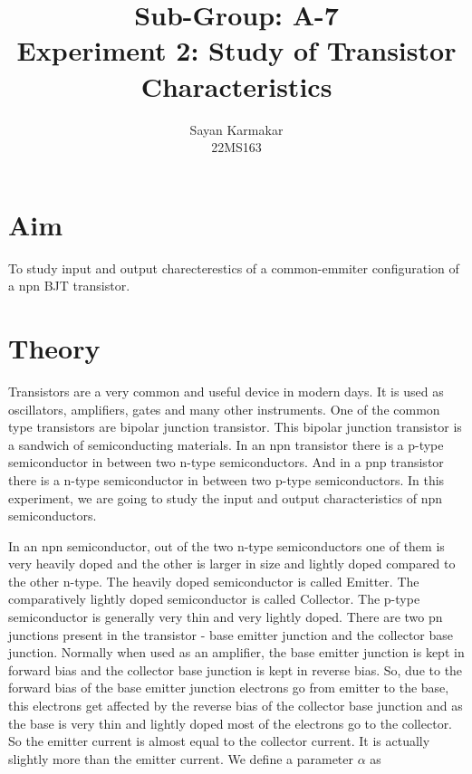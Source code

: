 \documentclass[12pt]{article}
\begin{document}
\title{Sub-Group: A-7 \\ Experiment 2: Study of Transistor Characteristics}


\author{Sayan Karmakar \\22MS163 }
\date{}
\maketitle

\section{Aim}
To study input and output charecterestics of a common-emmiter configuration of a npn BJT transistor.

\section{Theory}
Transistors are a very common and useful device in modern days. It is used as oscillators, amplifiers, gates and many other instruments. One of the common type transistors are bipolar junction transistor. This bipolar junction transistor is a sandwich of semiconducting materials. In an npn transistor there is a p-type semiconductor in between two n-type semiconductors. And in a pnp transistor there is a n-type semiconductor in between two p-type semiconductors. In this experiment, we are going to study the input and output characteristics of npn semiconductors.

In an npn semiconductor, out of the two n-type semiconductors one of them is very heavily doped and the other is larger in size and lightly doped compared to the other n-type. The heavily doped semiconductor is called Emitter. The comparatively lightly doped semiconductor is called Collector. The p-type semiconductor is generally very thin and very lightly doped. There are two pn junctions present in the transistor - base emitter junction and the collector base junction. Normally when used as an amplifier, the base emitter junction is kept in forward bias and the collector base junction is kept in reverse bias. So, due to the forward bias of the base emitter junction electrons go from emitter to the base, this electrons get affected by the reverse bias of the collector base junction and as the base is very thin and lightly doped most of the electrons go to the collector. So the emitter current is almost equal to the collector current. It is actually slightly more than the emitter current. We define a parameter \( \alpha \) as 
\end{document}
